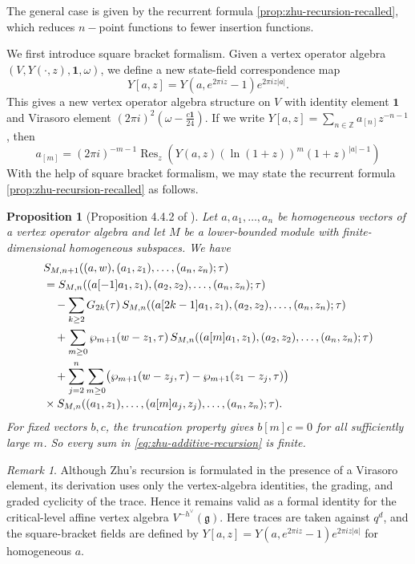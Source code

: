 \documentclass[11pt,a4paper]{amsart}
\numberwithin{equation}{section}
\newtheorem{proposition}[theorem]{Proposition}
\theoremstyle{definition}
\theoremstyle{remark}
\newtheorem{remark}[theorem]{Remark}
\DeclareMathOperator*{\Res}{Res}
\newcommand{\ZZ}{\mathbb Z}
\newcommand{\g}{\mathfrak g}
\newcommand{\one}{\mathbf 1}
\newcommand{\ii}{i}
\begin{document}
The general case is given by the recurrent formula \eqref{prop:zhu-recursion-recalled}, which reduces $n-$point functions to fewer insertion functions. 

We first introduce square bracket formalism. Given a vertex operator algebra $(V,Y(\cdot,z),\one,\omega)$, we define a new state-field correspondence map
\begin{equation*}
Y[a,z]=Y(a,e^{2\pi\ii z}-1)e^{2\pi \ii z|a|}.
\end{equation*}
This gives a new vertex operator algebra structure on $V$ with identity element $\one$ and Virasoro element $(2\pi\ii)^2(\omega-\frac{c\one}{24})$. If we write $Y[a,z]=\sum_{n\in\ZZ}a_{[n]}z^{-n-1}$, then 
\begin{equation*}
a_{[m]}=(2\pi\ii)^{-m-1}\Res_z \left(Y(a,z)\left(\ln(1+z)\right)^m(1+z)^{|a|-1} \right)
\end{equation*}
With the help of square bracket formalism, we may state the recurrent formula \eqref{prop:zhu-recursion-recalled} as follows.
\begin{proposition}[Proposition 4.4.2 of \cite{Zhu}]
\label{prop:zhu-recursion-recalled}
Let $a,a_1,\ldots,a_n$ be homogeneous vectors of a vertex operator
algebra and let $M$ be a lower-bounded module with finite-dimensional
homogeneous subspaces. We have \cite{Zhu}
\begin{align}
 &S_{M,n+1}
 ((a,w),(a_1,z_1),\ldots,(a_n,z_n);\tau)
 \notag\\
 &={}
S_{M,n}
 ((a[-1]a_1,z_1),(a_2,z_2),\ldots,(a_n,z_n);\tau)
 \notag\\
 &\quad-
 \sum_{k\geq2}G_{2k}(\tau)\,
 S_{M,n}
 ((a[2k-1]a_1,z_1),(a_2,z_2),\ldots,(a_n,z_n);\tau)
 \notag\\
 &\quad+
 \sum_{m\geq0}\wp_{m+1}(w-z_1,\tau)\,
 S_{M,n}
 ((a[m]a_1,z_1),(a_2,z_2),\ldots,(a_n,z_n);\tau)
 \notag\\
 &\quad+
 \sum_{j=2}^{n}\sum_{m\geq0}
 \bigl(
   \wp_{m+1}(w-z_j,\tau)
   -\wp_{m+1}(z_1-z_j,\tau)
 \bigr)
 \notag\\[-0.2em]
 &\times
 S_{M,n}
 ((a_1,z_1),\ldots,(a[m]a_j,z_j),\ldots,
  (a_n,z_n);\tau).
 \label{eq:zhu-additive-recursion}
\end{align}
For fixed vectors $b,c$, the truncation property gives $b[m]c=0$ for all
sufficiently large $m$. So every sum in \eqref{eq:zhu-additive-recursion} is finite.
\end{proposition}

\begin{remark}
Although Zhu's recursion is formulated in the presence of a Virasoro element, its derivation uses only the vertex-algebra identities, the grading, and graded cyclicity of the trace. Hence it remains valid as a formal identity for the critical-level affine vertex algebra $V^{-h^\vee}(\g)$. Here traces are taken against $q^d$, and the square-bracket fields are defined by $Y[a,z]=Y(a,e^{2\pi\ii z}-1)e^{2\pi\ii z|a|}$ for homogeneous $a$.
\end{remark}
\end{document}
